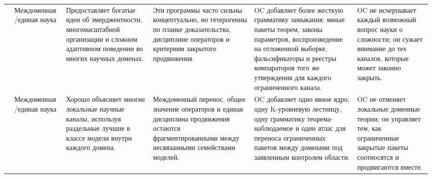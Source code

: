 \begin{longtable}{@{}L{0.17\textwidth}L{0.09\textwidth}L{0.17\textwidth}L{0.17\textwidth}L{0.20\textwidth}L{0.14\textwidth}@{}}
 & Междоменная /\allowbreak единая наука & Предоставляет богатые идеи об эмерджентности, многомасштабной организации и сложном адаптивном поведении во многих научных доменах. & Эти программы часто сильны концептуально, но гетерогенны по планке доказательства, дисциплине операторов и критериям закрытого продвижения. & OC добавляет более жесткую грамматику замыкания: явные пакеты теорем, законы параметров, воспроизведение на отложенной выборке, фальсификаторы и реестры компараторов того же утверждения для каждого ограниченного канала. & OC не исчерпывает каждый возможный вопрос науки о сложности; он сужает внимание до тех каналов, которые может законно закрыть. \\
 & Междоменная /\allowbreak единая наука & Хорошо объясняет многие локальные научные каналы, используя раздельные лучшие в классе модели внутри каждого домена. & Междоменный перенос, общее значение операторов и единая дисциплина продвижения остаются фрагментированными между несвязанными семействами моделей. & OC добавляет одно явное ядро, одну K-уровневую лестницу, одну грамматику теорема-наблюдаемое и один атлас для переноса ограниченных пакетов между доменами под заявленным контролем области. & OC не отменяет локальные доменные теории; он управляет тем, как ограниченные закрытые пакеты соотносятся и продвигаются вместе. \\
\bottomrule
\end{longtable}
\endgroup

